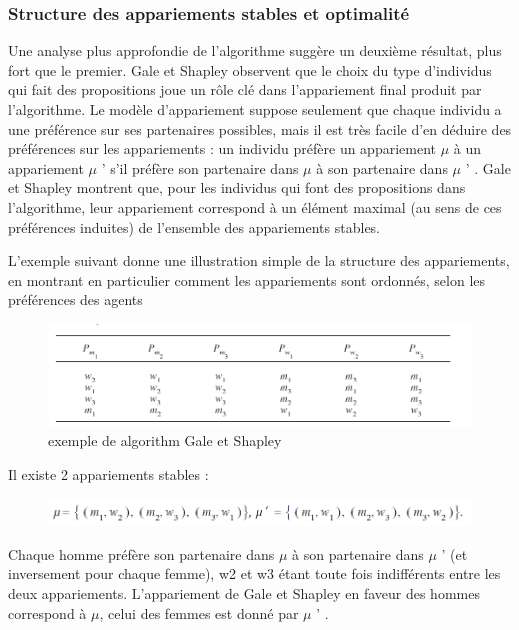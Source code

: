 \subsubsection{Structure des appariements stables et optimalité}
\par Une analyse plus approfondie de l'algorithme suggère un deuxième résultat, plus fort que le premier. Gale et Shapley observent que le choix du type d'individus qui fait des propositions joue un rôle clé dans l’appariement final produit par l'algorithme. Le modèle d’appariement suppose seulement que chaque individu a une préférence sur ses partenaires possibles, mais il est très facile d’en déduire des préférences sur les appariements : un individu préfère un appariement $\mu$ à un appariement $\mu$ ' s’il préfère son partenaire dans $\mu$ à son partenaire dans $\mu$ ' . Gale et Shapley montrent que, pour les individus qui font des propositions dans l’algorithme, leur appariement correspond à un élément maximal (au sens de ces préférences induites) de l’ensemble des appariements stables.
\\ 
\par L’exemple suivant donne une illustration simple de la structure des appariements, en montrant en particulier comment les appariements sont ordonnés, selon les préférences des agents 
\begin{figure}[h!]
	\center
	\includegraphics[scale=0.7]{img/exemple.png}
	\caption{exemple de algorithm Gale et Shapley }
	
\end{figure}
\par Il existe 2 appariements stables :

\begin{figure}[h!]
	\center
	\includegraphics[scale=0.7]{img/inst.png}
	
\end{figure}

Chaque homme préfère son partenaire dans $\mu$ à son partenaire dans $\mu$ ' (et inversement pour chaque femme), w2 et w3 étant toute fois indifférents entre les deux appariements. L’appariement de Gale et Shapley en faveur des hommes correspond à $\mu$, celui des femmes est donné par $\mu$ ' .
\cite{abstract}

